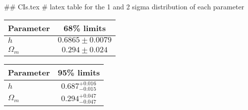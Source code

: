 ## CIs.tex
# latex table for the 1 and 2 sigma distribution of each parameter

\begin{tabular} { l  c}
 Parameter &  68\% limits\\
\hline
{\boldmath$h              $} & $0.6865\pm 0.0079          $\\
{\boldmath$\Omega_m       $} & $0.294\pm 0.024            $\\
\hline
\end{tabular}

\begin{tabular} { l  c}
 Parameter &  95\% limits\\
\hline
{\boldmath$h              $} & $0.687^{+0.016}_{-0.015}   $\\
{\boldmath$\Omega_m       $} & $0.294^{+0.047}_{-0.047}   $\\
\hline
\end{tabular}
